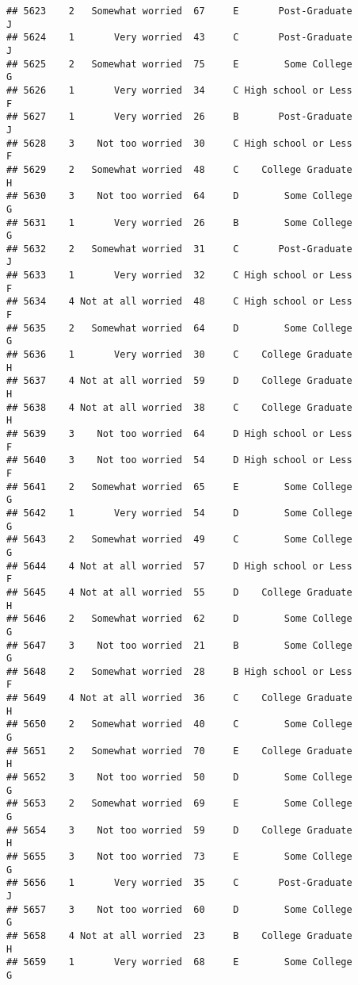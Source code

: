 \documentclass[
]{article}
\begin{document}
\begin{verbatim}
## 5623    2   Somewhat worried  67     E       Post-Graduate         J
## 5624    1       Very worried  43     C       Post-Graduate         J
## 5625    2   Somewhat worried  75     E        Some College         G
## 5626    1       Very worried  34     C High school or Less         F
## 5627    1       Very worried  26     B       Post-Graduate         J
## 5628    3    Not too worried  30     C High school or Less         F
## 5629    2   Somewhat worried  48     C    College Graduate         H
## 5630    3    Not too worried  64     D        Some College         G
## 5631    1       Very worried  26     B        Some College         G
## 5632    2   Somewhat worried  31     C       Post-Graduate         J
## 5633    1       Very worried  32     C High school or Less         F
## 5634    4 Not at all worried  48     C High school or Less         F
## 5635    2   Somewhat worried  64     D        Some College         G
## 5636    1       Very worried  30     C    College Graduate         H
## 5637    4 Not at all worried  59     D    College Graduate         H
## 5638    4 Not at all worried  38     C    College Graduate         H
## 5639    3    Not too worried  64     D High school or Less         F
## 5640    3    Not too worried  54     D High school or Less         F
## 5641    2   Somewhat worried  65     E        Some College         G
## 5642    1       Very worried  54     D        Some College         G
## 5643    2   Somewhat worried  49     C        Some College         G
## 5644    4 Not at all worried  57     D High school or Less         F
## 5645    4 Not at all worried  55     D    College Graduate         H
## 5646    2   Somewhat worried  62     D        Some College         G
## 5647    3    Not too worried  21     B        Some College         G
## 5648    2   Somewhat worried  28     B High school or Less         F
## 5649    4 Not at all worried  36     C    College Graduate         H
## 5650    2   Somewhat worried  40     C        Some College         G
## 5651    2   Somewhat worried  70     E    College Graduate         H
## 5652    3    Not too worried  50     D        Some College         G
## 5653    2   Somewhat worried  69     E        Some College         G
## 5654    3    Not too worried  59     D    College Graduate         H
## 5655    3    Not too worried  73     E        Some College         G
## 5656    1       Very worried  35     C       Post-Graduate         J
## 5657    3    Not too worried  60     D        Some College         G
## 5658    4 Not at all worried  23     B    College Graduate         H
## 5659    1       Very worried  68     E        Some College         G

\end{verbatim}
\end{document}
